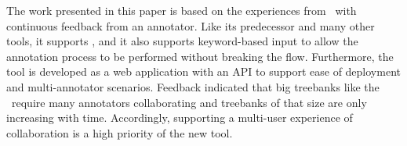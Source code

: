 The work presented in this paper is based on the experiences from \boatvone\ with continuous feedback from an annotator. 
Like its predecessor and many other tools, it supports \ud, and it also supports keyword-based input to allow the annotation process to be performed without breaking the flow. 
Furthermore, the tool is developed as a web application with an API to support ease of deployment and multi-annotator scenarios. 
Feedback indicated that big treebanks like the \bountreebank\ require many annotators collaborating and treebanks of that size are only increasing with time.
Accordingly, supporting a multi-user experience of collaboration is a high priority of the new tool.
